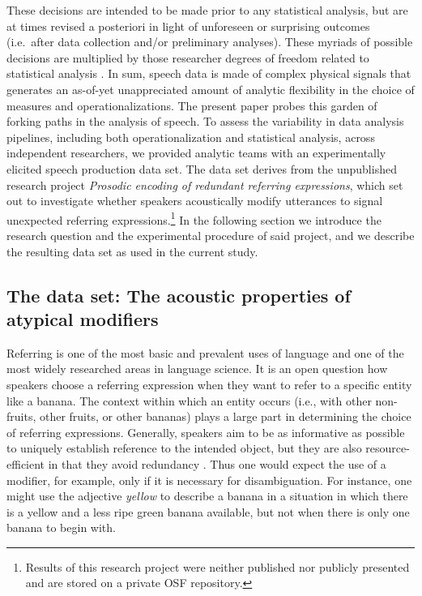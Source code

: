 \documentclass[Review,times,sageh]{sagej}
\begin{document}
These decisions are intended to be made prior to any statistical
analysis, but are at times revised a posteriori in light of unforeseen
or surprising outcomes (i.e.~after data collection and/or preliminary
analyses). These myriads of possible decisions are multiplied by those
researcher degrees of freedom related to statistical analysis
\citep[e.g.][]{wicherts2016}. In sum, speech data is made of complex
physical signals that generates an as-of-yet unappreciated amount of
analytic flexibility in the choice of measures and operationalizations.
The present paper probes this garden of forking paths in the analysis of
speech. To assess the variability in data analysis pipelines, including
both operationalization and statistical analysis, across independent
researchers, we provided analytic teams with an experimentally elicited
speech production data set. The data set derives from the unpublished
research project \emph{Prosodic encoding of redundant referring
expressions}, which set out to investigate whether speakers acoustically
modify utterances to signal unexpected referring expressions.\footnote{Results
  of this research project were neither published nor publicly presented
  and are stored on a private OSF repository.} In the following section
we introduce the research question and the experimental procedure of
said project, and we describe the resulting data set as used in the
current study.

\hypertarget{s:dataset}{\subsection{The data set: The acoustic
properties of atypical modifiers}\label{s:dataset}}

Referring is one of the most basic and prevalent uses of language and
one of the most widely researched areas in language science. It is an
open question how speakers choose a referring expression when they want
to refer to a specific entity like a banana. The context within which an
entity occurs (i.e., with other non-fruits, other fruits, or other
bananas) plays a large part in determining the choice of referring
expressions. Generally, speakers aim to be as informative as possible to
uniquely establish reference to the intended object, but they are also
resource-efficient in that they avoid redundancy \citep{grice1975logic}.
Thus one would expect the use of a modifier, for example, only if it is
necessary for disambiguation. For instance, one might use the adjective
\emph{yellow} to describe a banana in a situation in which there is a
yellow and a less ripe green banana available, but not when there is
only one banana to begin with.
\end{document}
